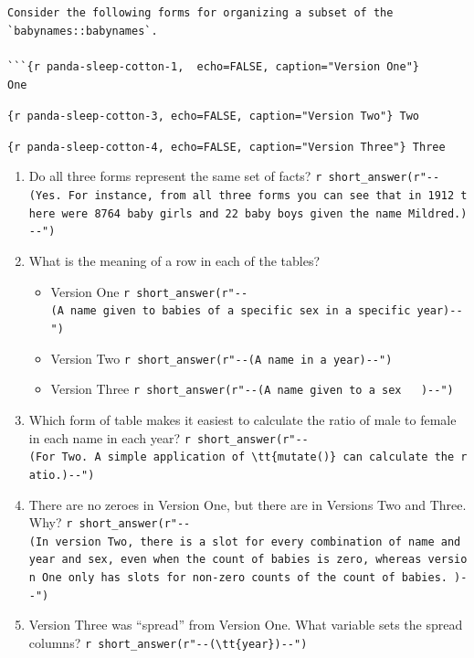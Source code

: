 \documentclass[
  letterpaper,
  DIV=11,
  numbers=noendperiod,
  oneside]{scrartcl}
\providecommand{\tightlist}{%
  \setlength{\itemsep}{0pt}\setlength{\parskip}{0pt}}\usepackage{longtable,booktabs,array}
\begin{document}
\begin{tcolorbox}
\begin{verbatim}


Consider the following forms for organizing a subset of the `babynames::babynames`.
    
```{r panda-sleep-cotton-1,  echo=FALSE, caption="Version One"}
One 
\end{verbatim}

\texttt{\{r\ panda-sleep-cotton-3,\ echo=FALSE,\ caption="Version\ Two"\}\ Two}

\texttt{\{r\ panda-sleep-cotton-4,\ echo=FALSE,\ caption="Version\ Three"\}\ Three}

\begin{enumerate}
\def\labelenumi{\arabic{enumi}.}
\item
  Do all three forms represent the same set of facts?
  \texttt{r\ short\_answer(r"-\/-(Yes.\ For\ instance,\ from\ all\ three\ forms\ you\ can\ see\ that\ in\ 1912\ there\ were\ 8764\ baby\ girls\ and\ 22\ baby\ boys\ given\ the\ name\ Mildred.)-\/-")}
\item
  What is the meaning of a row in each of the tables?

  \begin{itemize}
  \tightlist
  \item
    Version One
    \texttt{r\ short\_answer(r"-\/-(A\ name\ given\ to\ babies\ of\ a\ specific\ sex\ in\ a\ specific\ year)-\/-")}
  \item
    Version Two
    \texttt{r\ short\_answer(r"-\/-(A\ name\ in\ a\ year)-\/-")}
  \item
    Version Three
    \texttt{r\ short\_answer(r"-\/-(A\ name\ given\ to\ a\ sex\ \ \ )-\/-")}
  \end{itemize}
\item
  Which form of table makes it easiest to calculate the ratio of male to
  female in each name in each year?
  \texttt{r\ short\_answer(r"-\/-(For\ Two.\ A\ simple\ application\ of\ \textbackslash{}tt\{mutate()\}\ can\ calculate\ the\ ratio.)-\/-")}
\item
  There are no zeroes in Version One, but there are in Versions Two and
  Three. Why?
  \texttt{r\ short\_answer(r"-\/-(In\ version\ Two,\ there\ is\ a\ slot\ for\ every\ combination\ of\ name\ and\ year\ and\ sex,\ even\ when\ the\ count\ of\ babies\ is\ zero,\ whereas\ version\ One\ only\ has\ slots\ for\ non-zero\ counts\ of\ the\ count\ of\ babies.\ )-\/-")}
\item
  Version Three was ``spread'' from Version One. What variable sets the
  spread columns?
  \texttt{r\ short\_answer(r"-\/-(\textbackslash{}tt\{year\})-\/-")}
\end{enumerate}

\end{tcolorbox}
\end{document}
